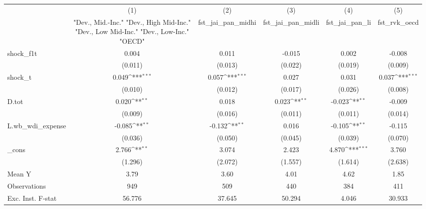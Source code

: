 {
\def\sym#1{\ifmmode^{#1}\else\(^{#1}\)\fi}
\begin{tabular}{l*{5}{c}}
\toprule
            &\multicolumn{1}{c}{(1)}&\multicolumn{1}{c}{(2)}&\multicolumn{1}{c}{(3)}&\multicolumn{1}{c}{(4)}&\multicolumn{1}{c}{(5)}\\
            &\multicolumn{1}{c}{ "Dev., Mid.-Inc." "Dev., High Mid-Inc." "Dev., Low Mid-Inc." "Dev., Low-Inc." "OECD" }&\multicolumn{1}{c}{fst\_jai\_pan\_midhi}&\multicolumn{1}{c}{fst\_jai\_pan\_midli}&\multicolumn{1}{c}{fst\_jai\_pan\_li}&\multicolumn{1}{c}{fst\_rvk\_oecd}\\
\midrule
shock\_f1t   &       0.004         &       0.011         &      -0.015         &       0.002         &      -0.008         \\
            &     (0.011)         &     (0.013)         &     (0.022)         &     (0.019)         &     (0.009)         \\
\addlinespace
shock\_t     &       0.049\sym{***}&       0.057\sym{***}&       0.027         &       0.031         &       0.037\sym{***}\\
            &     (0.010)         &     (0.012)         &     (0.017)         &     (0.026)         &     (0.008)         \\
\addlinespace
D.tot       &       0.020\sym{**} &       0.018         &       0.023\sym{**} &      -0.023\sym{**} &      -0.009         \\
            &     (0.009)         &     (0.016)         &     (0.011)         &     (0.011)         &     (0.014)         \\
\addlinespace
L.wb\_wdi\_expense&      -0.085\sym{**} &      -0.132\sym{**} &       0.016         &      -0.105\sym{**} &      -0.115         \\
            &     (0.036)         &     (0.050)         &     (0.045)         &     (0.039)         &     (0.070)         \\
\addlinespace
\_cons      &       2.766\sym{**} &       3.074         &       2.423         &       4.870\sym{***}&       3.760         \\
            &     (1.296)         &     (2.072)         &     (1.557)         &     (1.614)         &     (2.638)         \\
\midrule
Mean Y      &        3.79         &        3.60         &        4.01         &        4.62         &        1.85         \\
Observations&         949         &         509         &         440         &         384         &         411         \\
Exc. Inst. F-stat&      56.776         &      37.645         &      50.294         &       4.046         &      30.933         \\
\bottomrule
\end{tabular}
}
